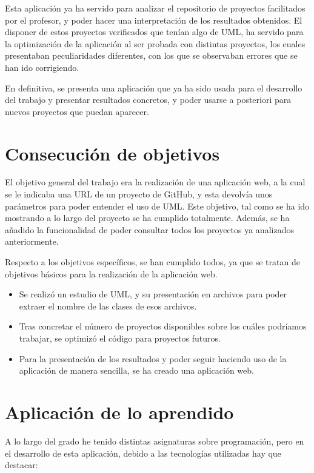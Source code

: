\documentclass[a4paper, 12pt]{book}
\begin{document}
Esta aplicación ya ha servido para analizar el repositorio de proyectos facilitados por el profesor,
y poder hacer una interpretación de los resultados obtenidos. El disponer de estos proyectos verificados
que tenían algo de UML, ha servido para la optimización de la aplicación al ser probada con distintas proyectos,
los cuales presentaban peculiaridades diferentes, con los que se observaban errores que se han ido corrigiendo.

En definitiva, se presenta una aplicación que ya ha sido usada para el desarrollo del trabajo y presentar resultados concretos,
y poder usarse a posteriori para nuevos proyectos que puedan aparecer.

\section{Consecución de objetivos}
\label{sec:consecucion-objetivos}

El objetivo general del trabajo era la realización de una aplicación web, a la cual se le
indicaba una URL de un proyecto de GitHub, y esta devolvía unos parámetros para poder
entender el uso de UML. Este objetivo, tal como se ha ido mostrando a lo largo del proyecto
se ha cumplido totalmente. Además, se ha añadido la funcionalidad de poder consultar todos los
proyectos ya analizados anteriormente.

Respecto a los objetivos específicos, se han cumplido todos, ya que se tratan de objetivos
básicos para la realización de la aplicación web.

\begin{itemize}
  \item Se realizó un estudio de UML, y su presentación en archivos para poder extraer el nombre
  de las clases de esos archivos.
  \item Tras concretar el número de proyectos disponibles sobre los cuáles podríamos trabajar,
  se optimizó el código para proyectos futuros.
  \item Para la presentación de los resultados y poder seguir haciendo uso de la aplicación de manera sencilla,
  se ha creado una aplicación web.
\end{itemize}


\section{Aplicación de lo aprendido}
\label{sec:aplicacion}

A lo largo del grado he tenido distintas asignaturas sobre programación, pero en el desarrollo de esta aplicación,
debido a las tecnologías utilizadas hay que destacar:
\end{document}
